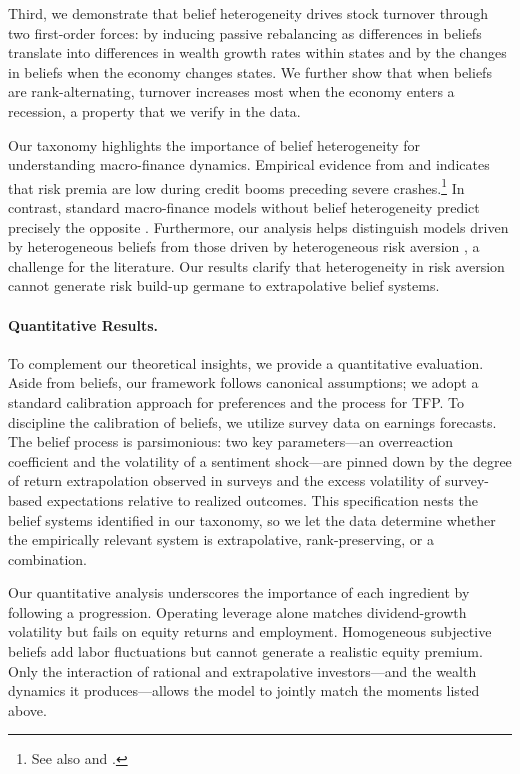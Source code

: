 Third, we demonstrate that belief heterogeneity drives stock turnover through two first-order forces: by inducing passive rebalancing as differences in beliefs translate into differences in wealth growth rates within states and by the changes in beliefs when the economy changes states. We further show that when beliefs are rank-alternating, turnover increases most when the economy enters a recession, a property that we verify in the data.

Our taxonomy highlights the importance of belief heterogeneity for understanding macro-finance dynamics. Empirical evidence from \citet{lopez2017credit} and \citet{krishnamurthy2017credit} indicates that risk premia are low during credit booms preceding severe crashes.\footnote{See also \citet{gennaioli2018crisis} and \citet{krishnamurthy2025dissecting}.
} In contrast, standard macro-finance models without belief heterogeneity predict precisely the opposite  \citep[e.g.,][]{brunnermeier2014macroeconomic,he2013intermediary}.
Furthermore, our analysis helps distinguish models driven by heterogeneous beliefs from those driven by heterogeneous risk aversion \citep[e.g.,][]{panageas2020implications}, a challenge for the literature. Our results clarify that heterogeneity in risk aversion cannot generate risk build-up germane to extrapolative belief systems. 

\paragraph{Quantitative Results.}
To complement our theoretical insights, we provide a quantitative evaluation. Aside from beliefs, our framework follows canonical assumptions; we adopt a standard calibration approach for preferences and the process for TFP. To discipline the calibration of beliefs, we utilize survey data on earnings forecasts. The belief process is parsimonious: two key parameters---an overreaction coefficient and the volatility of a sentiment shock---are pinned down by the degree of return extrapolation observed in surveys and the excess volatility of survey-based expectations relative to realized outcomes. This specification nests the belief systems identified in our taxonomy, so we let the data determine whether the empirically relevant system is extrapolative, rank-preserving, or a combination.

Our quantitative analysis underscores the importance of each ingredient by following a progression. Operating leverage alone matches dividend-growth volatility but fails on equity returns and employment. Homogeneous subjective beliefs add labor fluctuations but cannot generate a realistic equity premium. Only the interaction of rational and extrapolative investors---and the wealth dynamics it produces---allows the model to jointly match the moments listed above.

